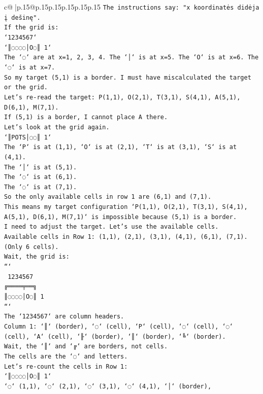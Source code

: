 \documentclass{article}
\begin{document}
{\begin{supertabular}{c@{$\;$}|p{.15\linewidth}@{}p{.15\linewidth}p{.15\linewidth}p{.15\linewidth}p{.15\linewidth}p{.15\linewidth}}
{{{\texttt{The instructions say: "x koordinatės didėja į dešinę".} \\
\texttt{If the grid is:} \\
\texttt{`1234567`} \\
\texttt{`║◌◌◌◌│O◌║ 1`} \\
\texttt{The `◌` are at x=1, 2, 3, 4. The `│` is at x=5. The `O` is at x=6. The `◌` is at x=7.} \\
\texttt{So my target (5,1) is a border. I must have miscalculated the target or the grid.} \\
\texttt{Let's re{-}read the target: P(1,1), O(2,1), T(3,1), S(4,1), A(5,1), D(6,1), M(7,1).} \\
\texttt{If (5,1) is a border, I cannot place A there.} \\
\texttt{Let's look at the grid again.} \\
\texttt{`║POTS│◌◌║ 1`} \\
\texttt{The `P` is at (1,1), `O` is at (2,1), `T` is at (3,1), `S` is at (4,1).} \\
\texttt{The `│` is at (5,1).} \\
\texttt{The `◌` is at (6,1).} \\
\texttt{The `◌` is at (7,1).} \\
\texttt{So the only available cells in row 1 are (6,1) and (7,1).} \\
\texttt{This means my target configuration `P(1,1), O(2,1), T(3,1), S(4,1), A(5,1), D(6,1), M(7,1)` is impossible because (5,1) is a border.} \\
\texttt{I need to adjust the target. Let's use the available cells.} \\
\texttt{Available cells in Row 1: (1,1), (2,1), (3,1), (4,1), (6,1), (7,1). (Only 6 cells).} \\
\texttt{Wait, the grid is:} \\
\texttt{```} \\
\texttt{ 1234567} \\
\texttt{╔════╤══╗} \\
\texttt{║◌◌◌◌│O◌║ 1} \\
\texttt{```} \\
\texttt{The `1234567` are column headers.} \\
\texttt{Column 1: `║` (border), `◌` (cell), `P` (cell), `◌` (cell), `◌` (cell), `A` (cell), `╟` (border), `║` (border), `╚` (border).} \\
\texttt{Wait, the `║` and `╔` are borders, not cells.} \\
\texttt{The cells are the `◌` and letters.} \\
\texttt{Let's re{-}count the cells in Row 1:} \\
\texttt{`║◌◌◌◌│O◌║ 1`} \\
\texttt{`◌` (1,1), `◌` (2,1), `◌` (3,1), `◌` (4,1), `│` (border),} \\
            }
        }
    }
     \\ \\


\end{supertabular}}
\end{document}
